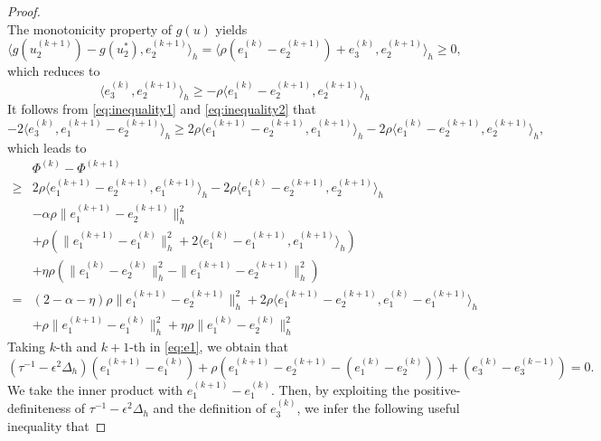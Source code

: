 \begin{proof}
\begin{equation}
\end{equation}
The monotonicity property of $g(u)$ yields
\begin{equation}
    \langle g(u_2^{(k+1)})-g(u_2^*),e_2^{(k+1)} \rangle_h=
    \langle \rho(e_1^{(k)}-e_2^{(k+1)})+e_3^{(k)},e_2^{(k+1)} \rangle_h\geq 0,
\end{equation}
which reduces to 
\begin{equation}\label{eq:inequality2}
    \langle e_3^{(k)},e_2^{(k+1)} \rangle _h\geq -\rho 
    \langle e_1^{(k)}-e_2^{(k+1)},e_2^{(k+1)} \rangle_h
\end{equation}
It follows from \eqref{eq:inequality1} and \eqref{eq:inequality2} that
\begin{equation}
    -2\langle e_3^{(k)},e_1^{(k+1)}-e_2^{(k+1)}\rangle_h\geq 2\rho \langle e_1^{(k+1)}-e_2^{(k+1)},e_1^{(k+1)}\rangle_h - 2\rho
    \langle e_1^{(k)}-e_2^{(k+1)},e_2^{(k+1)} \rangle_h,
\end{equation}
which leads to
\begin{equation}
\begin{aligned}
&\Phi^{(k)}-\Phi^{(k+1)}\\
\geq &
2\rho \langle e_1^{(k+1)}-e_2^{(k+1)},e_1^{(k+1)}\rangle_h - 2\rho
    \langle e_1^{(k)}-e_2^{(k+1)},e_2^{(k+1)} \rangle_h \\
    &-\alpha \rho \|e_1^{(k+1)}-e_2^{(k+1)}\|_h^2\\
&+\rho (\|e_1^{(k+1)}-e_1^{(k)}\|_h^2
    +2\langle e_1^{(k)}-e_1^{(k+1)},e_1^{(k+1)}\rangle_h
    )\\
    &+\eta \rho (\|e_1^{(k)}-
    e_2^{(k)}\|_h^2-\|e_1^{(k+1)}-
    e_2^{(k+1)}\|_h^2)\\
=&(2-\alpha-\eta)\rho \|e_1^{(k+1)}-
    e_2^{(k+1)}\|_h^2 +
    2\rho \langle e_1^{(k+1)}-e_2^{(k+1)},e_1^{(k)}-e_1^{(k+1)} \rangle_h\\
&+\rho \|e_1^{(k+1)}-e_1^{(k)}\|_h^2+
\eta \rho \|e_1^{(k)}-
    e_2^{(k)}\|_h^2
\end{aligned}
\end{equation}
Taking $k$-th and $k+1$-th in \eqref{eq:e1}, we obtain that
\begin{equation}
    (\tau^{-1}-\epsilon^2 \Delta_h)(e_1^{(k+1)}-e_1^{(k)})+\rho (e_1^{(k+1)}-e_2^{(k+1)}-(e_1^{(k)}-e_2^{(k)}))+(e_3^{(k)}-e_3^{(k-1)})=0.
\end{equation}
We take the inner product with $e_1^{(k+1)}-e_1^{(k)}$. Then, by exploiting the positive-definiteness of $\tau^{-1}-\epsilon^2 \Delta_h$ 
and the definition of $e_3^{(k)}$, we infer the following useful inequality that

\end{proof}

